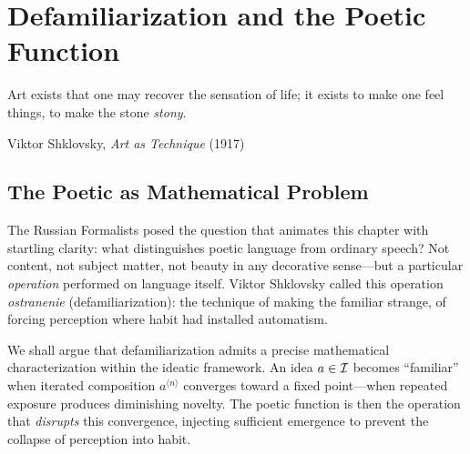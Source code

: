 %
%
%

\chapter{Defamiliarization and the Poetic Function}
\label{ch:defamiliarization}

\epigraph{Art exists that one may recover the sensation of life; it exists to
make one feel things, to make the stone \emph{stony}.}{Viktor Shklovsky,
\textit{Art as Technique} (1917)}

\section{The Poetic as Mathematical Problem}

The Russian Formalists posed the question that animates this chapter with
startling clarity: what distinguishes poetic language from ordinary speech?
Not content, not subject matter, not beauty in any decorative sense---but a
particular \emph{operation} performed on language itself.  Viktor Shklovsky
called this operation \emph{ostranenie} (defamiliarization): the technique of
making the familiar strange, of forcing perception where habit had installed
automatism.

We shall argue that defamiliarization admits a precise mathematical
characterization within the ideatic framework.  An idea $a \in \mathcal{I}$ becomes
``familiar'' when iterated composition $a^{\langle n \rangle}$ converges toward a
fixed point---when repeated exposure produces diminishing novelty.  The poetic
function is then the operation that \emph{disrupts} this convergence, injecting
sufficient emergence to prevent the collapse of perception into habit.

